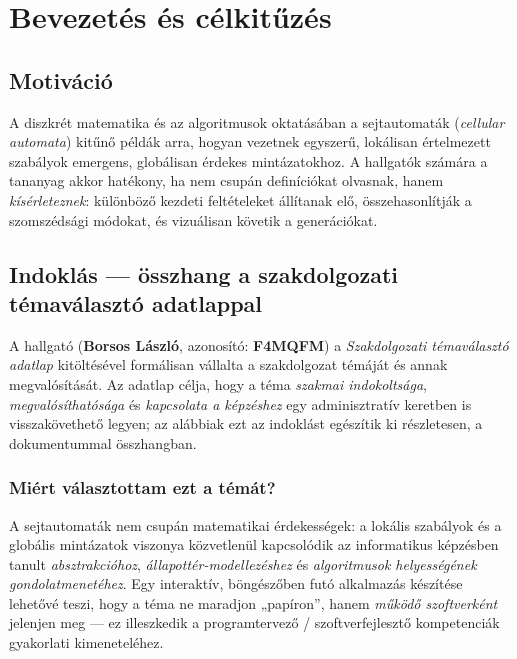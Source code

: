 \mainmatter

\chapter{Bevezetés és célkitűzés}

\section{Motiváció}
A diszkrét matematika és az algoritmusok oktatásában a sejtautomaták (\emph{cellular automata}) kitűnő példák arra, hogyan vezetnek egyszerű, lokálisan értelmezett szabályok emergens, globálisan érdekes mintázatokhoz. A hallgatók számára a tananyag akkor hatékony, ha nem csupán definíciókat olvasnak, hanem \emph{kísérleteznek}: különböző kezdeti feltételeket állítanak elő, összehasonlítják a szomszédsági módokat, és vizuálisan követik a generációkat.

\section{Indoklás — összhang a szakdolgozati témaválasztó adatlappal}
A hallgató (\textbf{Borsos László}, azonosító: \textbf{F4MQFM}) a \emph{Szakdolgozati témaválasztó adatlap} kitöltésével formálisan vállalta a szakdolgozat témáját és annak megvalósítását. Az adatlap célja, hogy a téma \emph{szakmai indokoltsága}, \emph{megvalósíthatósága} és \emph{kapcsolata a képzéshez} egy adminisztratív keretben is visszakövethető legyen; az alábbiak ezt az indoklást egészítik ki részletesen, a \texttt{\TemaValasztoUt\TemaValasztoPdf} dokumentummal összhangban.

\subsection{Miért választottam ezt a témát?}
A sejtautomaták nem csupán matematikai érdekességek: a lokális szabályok és a globális mintázatok viszonya közvetlenül kapcsolódik az informatikus képzésben tanult \emph{absztrakcióhoz}, \emph{állapottér-modellezéshez} és \emph{algoritmusok helyességének gondolatmenetéhez}. Egy interaktív, böngészőben futó alkalmazás készítése lehetővé teszi, hogy a téma ne maradjon „papíron”, hanem \emph{működő szoftverként} jelenjen meg — ez illeszkedik a programtervező / szoftverfejlesztő kompetenciák gyakorlati kimeneteléhez.

